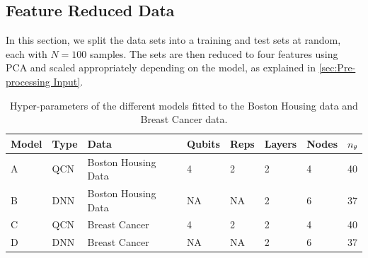 \subsection{Feature Reduced Data}\label{sec:Feature Reduced Data}
In this section, we split the data sets into a training and test sets at random, each with $N=100$ samples. The sets are then reduced to four features using PCA and scaled appropriately depending on the model, as explained in \autoref{sec:Pre-processing Input}. 

\begin{table}[H]
\centering
\begin{tabular}{|l|l|l|l|l|l|l|l|}
\hline
Model& Type& Data& Qubits& Reps& Layers & Nodes &$n_{\theta}$ \\ \hline
A    & QCN & Boston Housing Data  & 4     & 2  &2     & 4& 40   \\ \hline
B    & DNN & Boston Housing Data  & NA    & NA &2     & 6& 37 \\ \Xhline{2\arrayrulewidth}
C    & QCN & Breast Cancer        & 4     & 2  &2     & 4& 40  \\ \hline
D    & DNN & Breast Cancer        & NA    & NA &2     & 6& 37  \\ \hline
\end{tabular}
\caption{Hyper-parameters of the different models fitted to the Boston Housing data and Breast Cancer data.} 
\label{tab:training models PCA}
\end{table}

